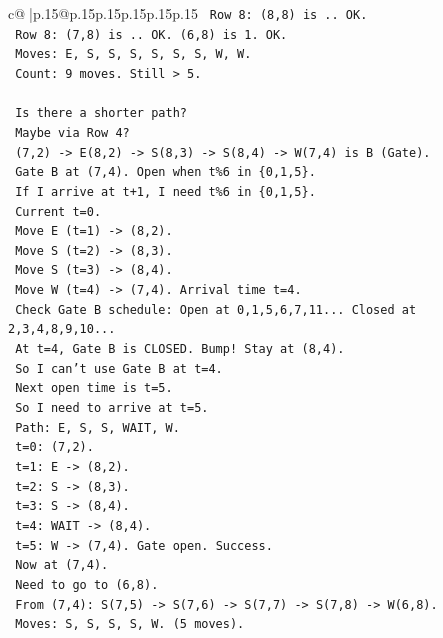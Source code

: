 \documentclass{article}
\begin{document}
{\begin{supertabular}{c@{$\;$}|p{.15\linewidth}@{}p{.15\linewidth}p{.15\linewidth}p{.15\linewidth}p{.15\linewidth}p{.15\linewidth}}
{{{\texttt{    Row 8: (8,8) is .. OK.} \\
\texttt{    Row 8: (7,8) is .. OK. (6,8) is 1. OK.} \\
\texttt{    Moves: E, S, S, S, S, S, S, W, W.} \\
\texttt{    Count: 9 moves. Still > 5.} \\
\\ 
\texttt{    Is there a shorter path?} \\
\texttt{    Maybe via Row 4?} \\
\texttt{    (7,2) {-}> E(8,2) {-}> S(8,3) {-}> S(8,4) {-}> W(7,4) is B (Gate).} \\
\texttt{    Gate B at (7,4). Open when t\%6 in \{0,1,5\}.} \\
\texttt{    If I arrive at t+1, I need t\%6 in \{0,1,5\}.} \\
\texttt{    Current t=0.} \\
\texttt{    Move E (t=1) {-}> (8,2).} \\
\texttt{    Move S (t=2) {-}> (8,3).} \\
\texttt{    Move S (t=3) {-}> (8,4).} \\
\texttt{    Move W (t=4) {-}> (7,4). Arrival time t=4.} \\
\texttt{    Check Gate B schedule: Open at 0,1,5,6,7,11... Closed at 2,3,4,8,9,10...} \\
\texttt{    At t=4, Gate B is CLOSED. Bump! Stay at (8,4).} \\
\texttt{    So I can't use Gate B at t=4.} \\
\texttt{    Next open time is t=5.} \\
\texttt{    So I need to arrive at t=5.} \\
\texttt{    Path: E, S, S, WAIT, W.} \\
\texttt{    t=0: (7,2).} \\
\texttt{    t=1: E {-}> (8,2).} \\
\texttt{    t=2: S {-}> (8,3).} \\
\texttt{    t=3: S {-}> (8,4).} \\
\texttt{    t=4: WAIT {-}> (8,4).} \\
\texttt{    t=5: W {-}> (7,4). Gate open. Success.} \\
\texttt{    Now at (7,4).} \\
\texttt{    Need to go to (6,8).} \\
\texttt{    From (7,4): S(7,5) {-}> S(7,6) {-}> S(7,7) {-}> S(7,8) {-}> W(6,8).} \\
\texttt{    Moves: S, S, S, S, W. (5 moves).} \\
}}}
\end{supertabular}}
\end{document}
